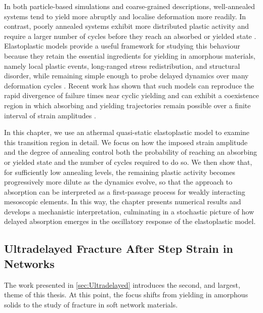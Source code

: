 \documentclass[asymmetricmargins]{library/duthesis}%
\begin{document}
In both particle-based simulations and coarse-grained descriptions, well-annealed systems tend to yield more abruptly and localise deformation more readily. In contrast, poorly annealed systems exhibit more distributed plastic activity and require a larger number of cycles before they reach an absorbed or yielded state \cite{Leishangthem2017,Popovi2018,barlow_ductile_2020,liuFateShearoscillatedAmorphous2022}. Elastoplastic models provide a useful framework for studying this behaviour because they retain the essential ingredients for yielding in amorphous materials, namely local plastic events, long-ranged stress redistribution, and structural disorder, while remaining simple enough to probe delayed dynamics over many deformation cycles \cite{nicolas_deformation_2018,pollard_yielding_2022}. Recent work has shown that such models can reproduce the rapid divergence of failure times near cyclic yielding and can exhibit a coexistence region in which absorbing and yielding trajectories remain possible over a finite interval of strain amplitudes \cite{khandareElastoplasticModellingCyclic2026,cochran_slow_2024}.

In this chapter, we use an athermal quasi-static elastoplastic model to examine this transition region in detail. We focus on how the imposed strain amplitude and the degree of annealing control both the probability of reaching an absorbing or yielded state and the number of cycles required to do so. We then show that, for sufficiently low annealing levels, the remaining plastic activity becomes progressively more dilute as the dynamics evolve, so that the approach to absorption can be interpreted as a first-passage process for weakly interacting mesoscopic elements. In this way, the chapter presents numerical results and develops a mechanistic interpretation, culminating in a stochastic picture of how delayed absorption emerges in the oscillatory response of the elastoplastic model.

\subsection*{Ultradelayed Fracture After Step Strain in Networks}
The work presented in \cref{sec:Ultradelayed} introduces the second, and largest, theme of this thesis. At this point, the focus shifts from yielding in amorphous solids to the study of fracture in soft network materials. 
\end{document}
